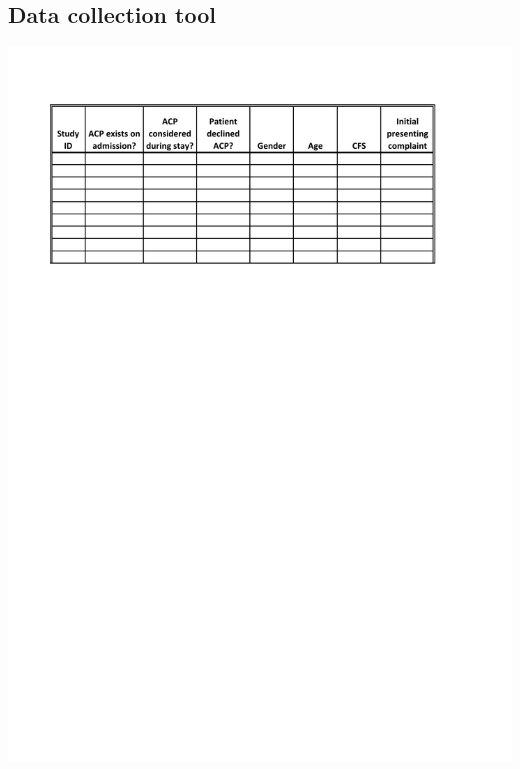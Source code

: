 \documentclass
[
	12pt,
	a4paper,
	oneside,
]{article}
\begin{document}
\begin{appendix}
\section{Data collection tool}
\label{appendix:tool}
\includegraphics[width=\textwidth]{dataCollection}


\end{appendix}
\end{document}
